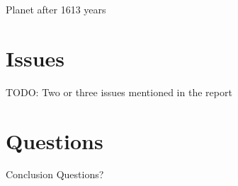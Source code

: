 \documentclass{beamer}
\newcommand{\todo}[1]{}
\renewcommand{\todo}[1]{{\color{red} TODO: {#1}}}
\begin{document}
\begin{frame}{Planet after 1613 years}
\end{frame}

\section{Issues}

\begin{frame}
	\todo{Two or three issues mentioned in the report}
\end{frame}

\section{Questions}

\begin{frame}{Conclusion}
    \huge{Questions?}
\end{frame}
\end{document}
